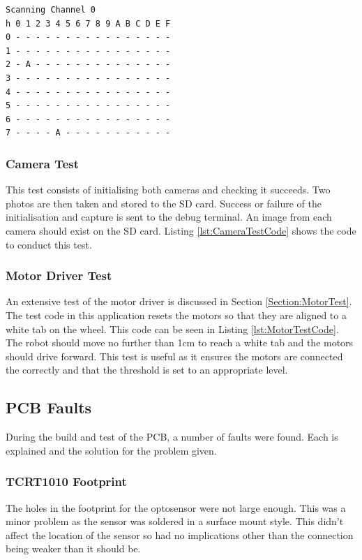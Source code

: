 \noindent\begin{minipage}{\textwidth}
\begin{lstlisting}[caption={Result of \itc bus scan with Channel 0 of the \itc multiplexer selected},label={lst:I2CTest}]
Scanning Channel 0
h 0 1 2 3 4 5 6 7 8 9 A B C D E F
0 - - - - - - - - - - - - - - - -
1 - - - - - - - - - - - - - - - -
2 - A - - - - - - - - - - - - - -
3 - - - - - - - - - - - - - - - -
4 - - - - - - - - - - - - - - - -
5 - - - - - - - - - - - - - - - -
6 - - - - - - - - - - - - - - - -
7 - - - - A - - - - - - - - - - -
\end{lstlisting}
\end{minipage}
\subsubsection{Camera Test}\label{Camera:Test}

This test consists of initialising both cameras and checking it succeeds. Two photos are then taken and stored to the SD card. Success or failure of the initialisation and capture is sent to the debug terminal. An image from each camera should exist on the SD card. Listing \ref{lst:CameraTestCode} shows the code to conduct this test.

\subsubsection{Motor Driver Test}\label{Motor:Test}
An extensive test of the motor driver is discussed in Section \ref{Section:MotorTest}. The test code in this application resets the motors so that they are aligned to a white tab on the wheel. This code can be seen in Listing \ref{lst:MotorTestCode}. The robot should move no further than 1cm to reach a white tab and the motors should drive forward. This test is useful as it ensures the motors are connected the correctly and that the threshold is set to an appropriate level.

\subsection{PCB Faults}
During the build and test of the PCB, a number of faults were found. Each is explained and the solution for the problem given. 
\subsubsection{TCRT1010 Footprint}
The holes in the footprint for the optosensor were not large enough. This was a minor problem as the sensor was soldered in a surface mount style. This didn't affect the location of the sensor so had no implications other than the connection being weaker than it should be. 

